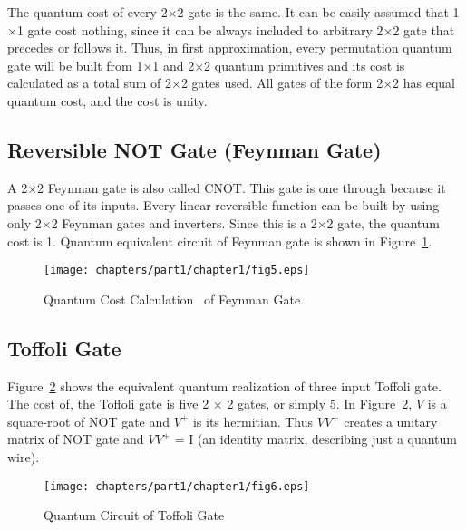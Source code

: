 \begin{property}\textnormal{
The quantum cost of every 2$\times$2 gate is the same. It can be easily assumed that 1$\times$1 gate cost nothing, since it can be always included to arbitrary 2$\times$2 gate that precedes or follows it. Thus, in first approximation, every permutation quantum gate will be built from 1$\times$1 and 2$\times$2 quantum primitives and its cost is calculated as a total sum of 2$\times$2 gates used. All gates of the form 2$\times$2 has equal quantum cost, and the cost is unity.}
\end{property}

\subsection{Reversible NOT Gate (Feynman Gate)}

\begin{example}\textnormal{
A 2$\times$2 Feynman gate is also called CNOT. This gate is one through because it passes one of its inputs. Every linear reversible function can be built by using~ only 2$\times$2 Feynman gates and inverters. Since this is a 2$\times$2 gate, the quantum cost is 1. Quantum equivalent circuit of Feynman gate is shown in Figure~\ref{fig:p1_c1_fig5}.}
\end{example}

\begin{figure}[h]
\centering
\texttt{[image: chapters/part1/chapter1/fig5.eps]}
\caption{Quantum Cost Calculation~ of Feynman Gate}
\label{fig:p1_c1_fig5}
\end{figure}

\subsection{Toffoli Gate}
Figure~\ref{fig:p1_c1_fig6} shows the equivalent quantum realization of three input Toffoli gate. The cost of, the Toffoli gate is five 2 $\times$ 2 gates, or simply 5. In Figure~\ref{fig:p1_c1_fig6}, $V$ is a square-root of NOT gate and $V^+$ is its hermitian. Thus $V V^+$ creates a unitary matrix of NOT gate and $V V^+$ = I (an identity matrix, describing just a quantum wire).

\begin{figure}[h]
\centering
\texttt{[image: chapters/part1/chapter1/fig6.eps]}
\caption{Quantum Circuit of Toffoli Gate}
\label{fig:p1_c1_fig6}
\end{figure}

